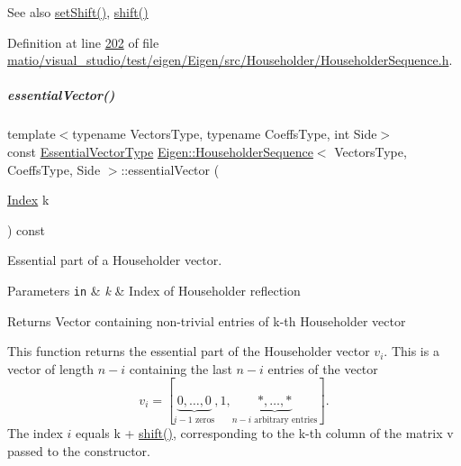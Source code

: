 \begin{DoxySeeAlso}{See also}
\hyperlink{group___householder___module_a2d8d996ce1085fd977850988735739f0}{set\+Shift()}, \hyperlink{group___householder___module_a34482bfad5563fd8a8a4264db76ac917}{shift()} 
\end{DoxySeeAlso}


Definition at line \hyperlink{matio_2visual__studio_2test_2eigen_2_eigen_2src_2_householder_2_householder_sequence_8h_source_l00202}{202} of file \hyperlink{matio_2visual__studio_2test_2eigen_2_eigen_2src_2_householder_2_householder_sequence_8h_source}{matio/visual\+\_\+studio/test/eigen/\+Eigen/src/\+Householder/\+Householder\+Sequence.\+h}.

\mbox{\label{group___householder___module_ac91cf37b0cbea9e504c89e021fd289ba}} 
\subparagraph{\texorpdfstring{essential\+Vector()}{essentialVector()}\hspace{0.1cm}{\footnotesize\ttfamily [2/2]}}
{\footnotesize\ttfamily template$<$typename Vectors\+Type, typename Coeffs\+Type, int Side$>$ \\
const \hyperlink{group___core___module_class_eigen_1_1_block}{Essential\+Vector\+Type} \hyperlink{group___householder___module_class_eigen_1_1_householder_sequence}{Eigen\+::\+Householder\+Sequence}$<$ Vectors\+Type, Coeffs\+Type, Side $>$\+::essential\+Vector (\begin{DoxyParamCaption}\item[{\hyperlink{group___core___module_a554f30542cc2316add4b1ea0a492ff02}{Index}}]{k }\end{DoxyParamCaption}) const\hspace{0.3cm}{\ttfamily [inline]}}



Essential part of a Householder vector. 


\begin{DoxyParams}[1]{Parameters}
\mbox{\tt in}  & {\em k} & Index of Householder reflection \\
\hline
\end{DoxyParams}
\begin{DoxyReturn}{Returns}
Vector containing non-\/trivial entries of k-\/th Householder vector
\end{DoxyReturn}
This function returns the essential part of the Householder vector $ v_i $. This is a vector of length $ n-i $ containing the last $ n-i $ entries of the vector \[ v_i = [\underbrace{0, \ldots, 0}_{i-1\mbox{ zeros}}, 1, \underbrace{*, \ldots,*}_{n-i\mbox{ arbitrary entries}} ]. \] The index $ i $ equals {\ttfamily k} + \hyperlink{group___householder___module_a34482bfad5563fd8a8a4264db76ac917}{shift()}, corresponding to the k-\/th column of the matrix {\ttfamily v} passed to the constructor.

